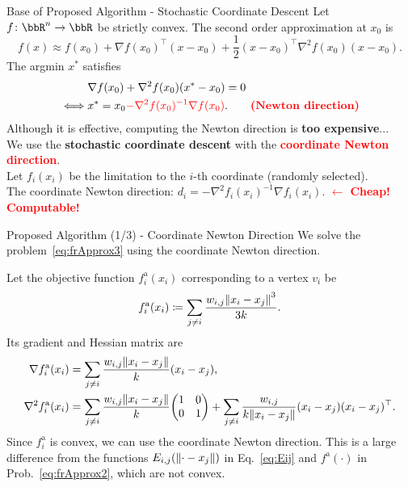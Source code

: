 \documentclass[dvipdfmx,13pt,aspectratio=169]{beamer}
\newcommand{\red}[1]{\textcolor{red}{#1}}
\newcommand{\defeq}{\coloneqq}
\newif\ifShowHidden
\begin{document}
\begin{frame}{Base of Proposed Algorithm - Stochastic Coordinate Descent}
  Let $f\colon \bbR^n \to \bbR$ be strictly convex. The second order approximation at $x_0$ is
  \begin{equation*}
    f(x) \approx f(x_0) + \nabla f(x_0)^\top (x - x_0) + \frac{1}{2} (x - x_0)^\top \nabla^2 f(x_0) (x - x_0).
  \end{equation*}
  The argmin $x^*$ satisfies
  \begin{align*}
         & \nabla f(x_0) + \nabla^2 f(x_0) (x^* - x_0) = 0                                                       \\
    \iff & x^* = x_0 \red{- \nabla^2 f(x_0)^{-1} \nabla f(x_0)}. \qquad \text{\textbf{\red{(Newton direction)}}}
  \end{align*}
  Although it is effective, computing the Newton direction is \textbf{too expensive}...\\[1em]

  We use the \large{\textbf{stochastic coordinate descent}} with the \large{\textbf{\red{coordinate Newton direction}}}.\\
  Let $f_i(x_i)$ be the limitation to the $i$-th coordinate (randomly selected).\\
  The coordinate Newton direction: $d_i = -\nabla^2 f_i(x_i)^{-1} \nabla f_i(x_i)$. \red{$\leftarrow$ \large{\textbf{Cheap! Computable!}}}
\end{frame}

\begin{frame}{Proposed Algorithm (1/3) - Coordinate Newton Direction}
  We solve the problem~\eqref{eq:frApprox3} using the coordinate Newton direction.

  Let the objective function $f^{\mathrm{a}}_i(x_i)$ corresponding to a vertex $v_i$ be
  \begin{equation*}
    f^{\mathrm{a}}_i(x_i) \defeq \sum_{j \neq i} \frac{w_{i,j}\norm{x_i - x_j}^3}{3k}.
  \end{equation*}
  Its gradient and Hessian matrix are
  \begin{align*}
    \nabla f^{\mathrm{a}}_i(x_i)   & = \sum_{j \neq i} \frac{w_{i,j}\norm{x_i - x_j}}{k} (x_i - x_j),     \\
    \nabla^2 f^{\mathrm{a}}_i(x_i) & = \sum_{j \neq i} \frac{w_{i,j}\norm{x_i - x_j}}{k} \mqty(1      & 0 \\0&1) + \sum_{j \neq i} \frac{w_{i,j}}{k\norm{x_i - x_j}} (x_i - x_j)(x_i - x_j)^\top.
  \end{align*}
  Since $f^{\mathrm{a}}_i$ is convex, we can use the coordinate Newton direction.
  This is a large difference from the functions $E_{i,j}(\norm{\cdot - x_j})$ in Eq.~\eqref{eq:Eij} and $f^{\mathrm{a}}(\cdot)$ in Prob.~\eqref{eq:frApprox2}, which are not convex.
\end{frame}
\end{document}
